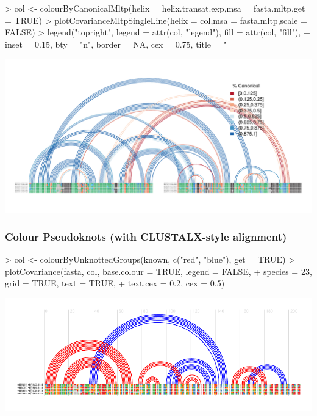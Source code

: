 \documentclass[letterpaper]{article}
\begin{document}
\begin{Schunk}
\begin{Sinput}
> col <- colourByCanonicalMltp(helix = helix.transat.exp,msa = fasta.mltp,get = TRUE)
> plotCovarianceMltpSingleLine(helix = col,msa = fasta.mltp,scale = FALSE)
> legend("topright", legend = attr(col, "legend"), fill = attr(col, "fill"),
+ 	inset = 0.15, bty = "n", border = NA, cex = 0.75, title = "%
\end{Sinput}
\end{Schunk}
\includegraphics{R4RNA-030}


\subsubsection{Colour Pseudoknots (with CLUSTALX-style alignment)}

\begin{Schunk}
\begin{Sinput}
> col <- colourByUnknottedGroups(known, c("red", "blue"), get = TRUE)
> plotCovariance(fasta, col, base.colour = TRUE, legend = FALSE,
+                species = 23, grid = TRUE, text = TRUE,
+                text.cex = 0.2, cex = 0.5)
\end{Sinput}
\end{Schunk}
\includegraphics{R4RNA-031}
\end{document}
